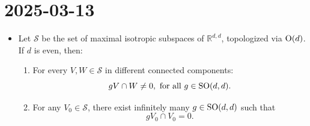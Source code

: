 \documentclass{report}
\begin{document}
\section{2025-03-13}
\begin{itemize}
    \item Let $\mathcal S$ be the set of maximal isotropic subspaces of $\mathbb R^{d,d}$, topologized via $\operatorname{{\mathrm{O}}}(d)$.
        If $d$ is even, then:
        \begin{enumerate}[label=(\roman*)]
            \item For every $V, W \in \mathcal S$ in different connected components:
            \[
            g V \cap W \neq 0, \text{ for all } g \in \operatorname{{\mathrm{SO}}}(d,d).
            \] 
            \item For any $V_0 \in \mathcal S$, there exist infinitely many $g \in \operatorname{{\mathrm{SO}}}(d,d)$ such that
            \[
            g V_0 \cap V_0 = 0.
            \]
        \end{enumerate}
\end{itemize}
\end{document}
